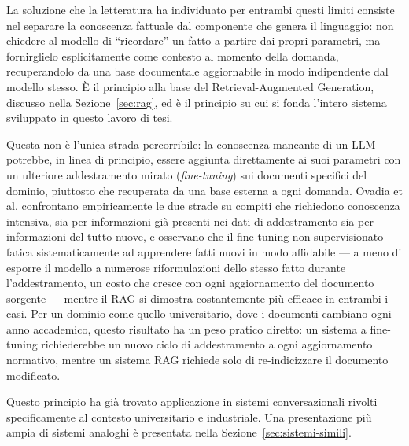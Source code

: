 La soluzione che la letteratura ha individuato per entrambi questi limiti consiste nel separare la conoscenza fattuale dal componente che genera il linguaggio: non chiedere al modello di ``ricordare'' un fatto a partire dai propri parametri, ma fornirglielo esplicitamente come contesto al momento della domanda, recuperandolo da una base documentale aggiornabile in modo indipendente dal modello stesso. È il principio alla base del Retrieval-Augmented Generation, discusso nella Sezione~\ref{sec:rag}, ed è il principio su cui si fonda l'intero sistema sviluppato in questo lavoro di tesi.

Questa non è l'unica strada percorribile: la conoscenza mancante di un LLM potrebbe, in linea di principio, essere aggiunta direttamente ai suoi parametri con un ulteriore addestramento mirato (\emph{fine-tuning}) sui documenti specifici del dominio, piuttosto che recuperata da una base esterna a ogni domanda. Ovadia et al. \cite{ovadia2024finetuning} confrontano empiricamente le due strade su compiti che richiedono conoscenza intensiva, sia per informazioni già presenti nei dati di addestramento sia per informazioni del tutto nuove, e osservano che il fine-tuning non supervisionato fatica sistematicamente ad apprendere fatti nuovi in modo affidabile --- a meno di esporre il modello a numerose riformulazioni dello stesso fatto durante l'addestramento, un costo che cresce con
ogni aggiornamento del documento sorgente --- mentre il RAG si dimostra costantemente più efficace in entrambi i casi. Per un dominio come quello universitario, dove i documenti cambiano ogni anno accademico, questo risultato ha un peso pratico diretto: un sistema a fine-tuning richiederebbe un nuovo ciclo di addestramento a ogni aggiornamento normativo, mentre un sistema RAG richiede solo di re-indicizzare il documento modificato.

Questo principio ha già trovato applicazione in sistemi conversazionali rivolti specificamente al contesto
universitario e industriale. Una presentazione più ampia di sistemi analoghi è presentata nella Sezione~\ref{sec:sistemi-simili}.